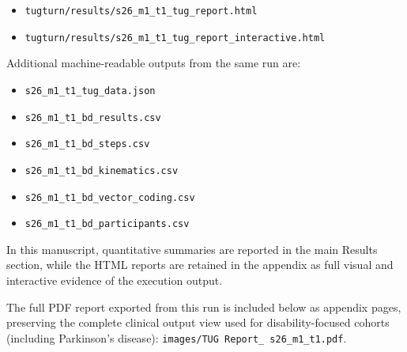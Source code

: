 \documentclass{article}
\begin{document}
\begin{itemize}
  \item \texttt{tugturn/results/s26\_m1\_t1\_tug\_report.html}
  \item \texttt{tugturn/results/s26\_m1\_t1\_tug\_report\_interactive.html}
\end{itemize}

Additional machine-readable outputs from the same run are:
\begin{itemize}
  \item \texttt{s26\_m1\_t1\_tug\_data.json}
  \item \texttt{s26\_m1\_t1\_bd\_results.csv}
  \item \texttt{s26\_m1\_t1\_bd\_steps.csv}
  \item \texttt{s26\_m1\_t1\_bd\_kinematics.csv}
  \item \texttt{s26\_m1\_t1\_bd\_vector\_coding.csv}
  \item \texttt{s26\_m1\_t1\_bd\_participants.csv}
\end{itemize}

In this manuscript, quantitative summaries are reported in the main Results section, while the HTML reports
are retained in the appendix as full visual and interactive evidence of the execution output.

The full PDF report exported from this run is included below as appendix pages, preserving the complete
clinical output view used for disability-focused cohorts (including Parkinson's disease):
\texttt{images/TUG Report\_ s26\_m1\_t1.pdf}.





\end{document}
